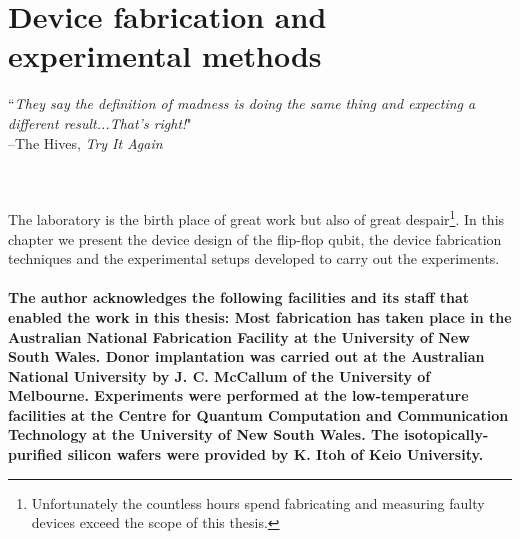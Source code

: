 
\chapter{Device fabrication and experimental methods} %

\label{Chapter5} 

\noindent\hrulefill
\vspace{0.5cm} %
\begin{flushright}
        ``\emph{They say the definition of madness is doing the same thing and expecting a different result...That's right!}"
\\ 
--The Hives, \textit{Try It Again} \\
\end{flushright}

\vspace{0.5cm}


\noindent\hrulefill
\vspace{0.5cm} %
\\
\hangindent=4cm
\\
The laboratory is the birth place of great work but also of great despair\footnote{Unfortunately the countless hours spend fabricating and measuring faulty devices exceed the scope of this thesis.}.
In this chapter we present the device design of the flip-flop qubit, the device fabrication techniques and the experimental setups developed to carry out the experiments.  
\\ \\
\footnotesize
\hangindent=4cm
\textbf{The author acknowledges the following facilities and its staff that enabled the work in this thesis: Most fabrication has taken place in the Australian National Fabrication Facility at the University of New South Wales. Donor implantation was carried out at the Australian National University by J. C. McCallum of the University of Melbourne. Experiments were performed at the low-temperature facilities at the Centre for Quantum Computation and Communication Technology at the University of New South Wales. The isotopically-purified silicon wafers were provided by K. Itoh of Keio University. }\\


\noindent \hrulefill
\clearpage

\normalsize

